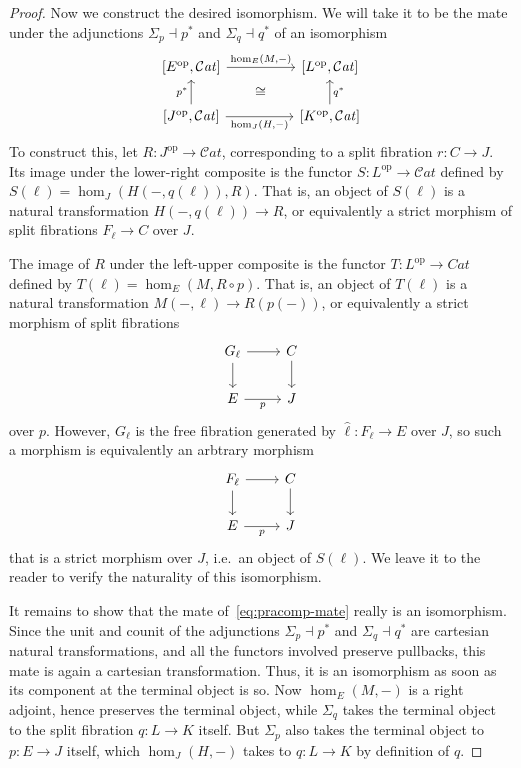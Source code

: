 \documentclass{article}
\theoremstyle{definition}
\theoremstyle{remark}
\def\Cat{\ensuremath{\mathcal{C}\mathit{at}}}
\def\op{^{\mathrm{op}}}
\begin{document}
\begin{proof}
  Now we construct the desired isomorphism.
  We will take it to be the mate under the adjunctions $\Sigma_p \dashv p^*$ and $\Sigma_q \dashv q^*$ of an isomorphism
  \begin{equation}
  \begin{tikzcd}[column sep=huge]
    {[E\op,\Cat]} \ar[r,"{\hom_E(M,-)}"] \ar[from=d,"p^*"] \ar[dr,phantom,"\cong"] & {[L\op,\Cat]} \ar[from=d,"q^*"']\\
    {[J\op,\Cat]} \ar[r,"{\hom_J(H,-)}"'] & {[K\op,\Cat]}
  \end{tikzcd}\label{eq:pracomp-mate}
  \end{equation}
  To construct this, let $R:J\op\to\Cat$, corresponding to a split fibration $r:C\to J$.
  Its image under the lower-right composite is the functor $S:L\op\to\Cat$ defined by $S(\ell) = \hom_J(H(-,q(\ell)),R)$.
  That is, an object of $S(\ell)$ is a natural transformation $H(-,q(\ell)) \to R$, or equivalently a strict morphism of split fibrations $F_\ell \to C$ over $J$.

  The image of $R$ under the left-upper composite is the functor $T:L\op\to Cat$ defined by $T(\ell) = \hom_E(M,R\circ p)$.
  That is, an object of $T(\ell)$ is a natural transformation $M(-,\ell) \to R(p(-))$, or equivalently a strict morphism of split fibrations
  \[
  \begin{tikzcd}
    G_\ell \ar[d] \ar[r] & C \ar[d] \\
    E \ar[r,"p"'] & J
  \end{tikzcd}
  \]
  over $p$.
  However, $G_\ell$ is the free fibration generated by $\hat\ell : F_\ell \to E$ over $J$, so such a morphism is equivalently an arbtrary morphism
  \[
  \begin{tikzcd}
    F_\ell \ar[d] \ar[r] & C \ar[d] \\
    E \ar[r,"p"'] & J
  \end{tikzcd}
  \]
  that is a strict morphism over $J$, i.e.\ an object of $S(\ell)$.
  We leave it to the reader to verify the naturality of this isomorphism.

  It remains to show that the mate of~\eqref{eq:pracomp-mate} really is an isomorphism.
  Since the unit and counit of the adjunctions $\Sigma_p \dashv p^*$ and $\Sigma_q \dashv q^*$ are cartesian natural transformations, and all the functors involved preserve pullbacks, this mate is again a cartesian transformation.
  Thus, it is an isomorphism as soon as its component at the terminal object is so.
  Now $\hom_E(M,-)$ is a right adjoint, hence preserves the terminal object, while $\Sigma_q$ takes the terminal object to the split fibration $q:L\to K$ itself.
  But $\Sigma_p$ also takes the terminal object to $p:E\to J$ itself, which $\hom_J(H,-)$ takes to $q:L\to K$ by definition of $q$.
\end{proof}
\end{document}
